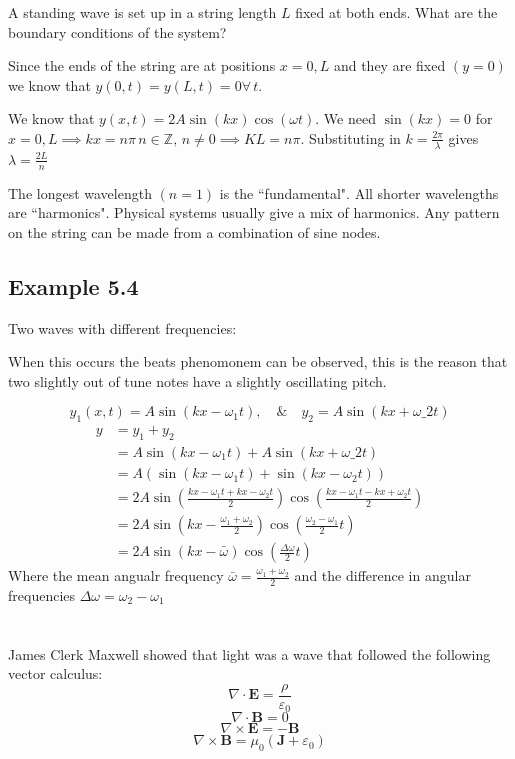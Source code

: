 \documentclass{article}
\renewcommand{\vec}[1]{\underline{#1}}
\renewcommand{\vec}[1]{\bm{#1}}
\newcommand{\vv}[1]{\vec{#1}}
\newcommand{\A}{\forall\,}
\newcommand{\bb}[1]{\mathbb{#1}}
\begin{document}
A standing wave is set up in a string length \(L\) fixed at both ends. What are the boundary conditions of the system?

Since the ends of the string are at positions \(x=0,L\) and they are fixed \((y=0)\) we know that \(y(0,t)=y(L,t)=0\A t\).

We know that \(y(x,t)=2A\sin(kx)\cos(\omega t)\). We need \(\sin(kx)=0\) for \(x=0,L\implies kx=n\pi\, n\in\bb Z,\,n\ne0\implies KL=n\pi\). Substituting in \(k=\frac{2\pi}{\lambda}\) gives \(\lambda=\frac{2L}{n}\)

The longest wavelength \((n=1)\) is the ``fundamental". All shorter wavelengths are ``harmonics". Physical systems usually give a mix of harmonics. Any pattern on the string can be made from a combination of sine nodes.

\subsection*{Example 5.4}

Two waves with different frequencies:

When this occurs the beats phenomonem can be observed, this is the reason that two slightly out of tune notes have a slightly oscillating pitch.

\[y_1(x,t)=A\sin(kx-\omega_1 t),\quad\&\quad y_2=A\sin(kx+\omega \_2t)\]
\begin{align*}
y&=y_1+y_2\\
&=A\sin\left(kx-\omega_1 t\right)+A\sin\left(kx+\omega \_2t\right)\\
&=A(\sin\left(kx-\omega_1t\right)+\sin\left(kx-\omega_2t\right))\\
&=2A\sin\left(\frac{kx-\omega_1t+kx-\omega_2t}{2}\right)\cos\left(\frac{kx-\omega_1t-kx+\omega_2t}{2}\right)\\
&=2A\sin\left(kx-\frac{\omega_1+\omega_2}{2}\right)\cos\left(\frac{\omega_2-\omega_1}{2}t\right)\\
&=2A\sin\left(kx-\bar{\omega}\right)\cos\left(\frac{\Delta \omega}{2}t\right)
\end{align*} 
Where the mean angualr frequency \(\bar\omega=\frac{\omega_1+\omega_2}{2}\) and the difference in angular frequencies \(\Delta\omega=\omega_2-\omega_1\)

\section{}

James Clerk Maxwell showed that light was a wave that followed the following vector calculus:
\[\nabla\cdot\vv E=\frac{\rho}{\varepsilon_0}\]
\[\nabla\cdot\vv B=0\]
\[\nabla\times\vv E=-\vv B\]
\[\nabla\times\vv B=\mu_0(\vv J+\varepsilon_0)\]
\end{document}
